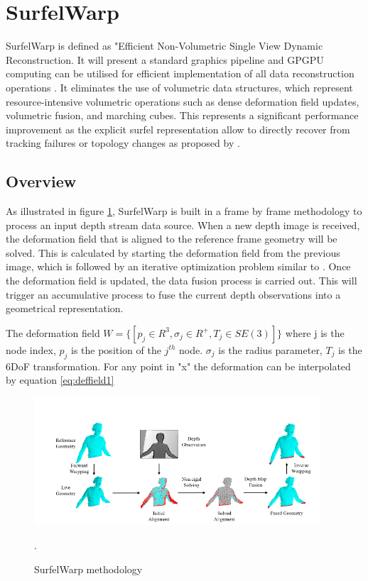 \documentclass[12pt]{report}
\begin{document}
\enlargethispage{\baselineskip}

\section{SurfelWarp}
SurfelWarp is defined as "Efficient Non-Volumetric Single View Dynamic Reconstruction. It will present a standard graphics pipeline and GPGPU computing can be utilised for efficient 
implementation of all data reconstruction operations . It eliminates the use of volumetric data structures, which represent resource-intensive volumetric operations such as dense deformation field updates, volumetric fusion, and marching cubes.
This represents a significant performance improvement as the explicit surfel representation allow to directly recover from tracking failures or topology changes as proposed by \citeauthor*{SurfelWarp}.

\subsection{Overview}
As illustrated in figure \ref{fig:surfelmetho}, SurfelWarp is built in a frame by frame methodology to process an input depth stream data source. 
When a new depth image is received, the deformation field that is aligned to the reference frame geometry will be solved. 
This is calculated by starting the deformation field from the previous image, which is followed by an iterative optimization problem similar to .
Once the deformation field is updated, the data fusion process is carried out. This will trigger an accumulative process to fuse the current depth observations into a geometrical representation. 

The deformation field $ W = \{[p_j \in R^{3},\sigma_{j} \in R^{+} ,T_j \in SE(3)]\}$ where j is the node index, $p_j$ is the position of the $j^{th}$ node. $\sigma_j$ is the radius parameter, $T_j$ is the 6DoF transformation.
For any point in "x" the deformation can be interpolated by equation \ref{eq:deffield1}


\newpage
\begin{figure}%
    \centering
    \includegraphics[width=0.95\textwidth]{surfelwarp1.png}
    \caption{SurfelWarp methodology }\cite[]{SurfelWarp}.
    \label{fig:surfelmetho}
\end{figure}
\end{document}
